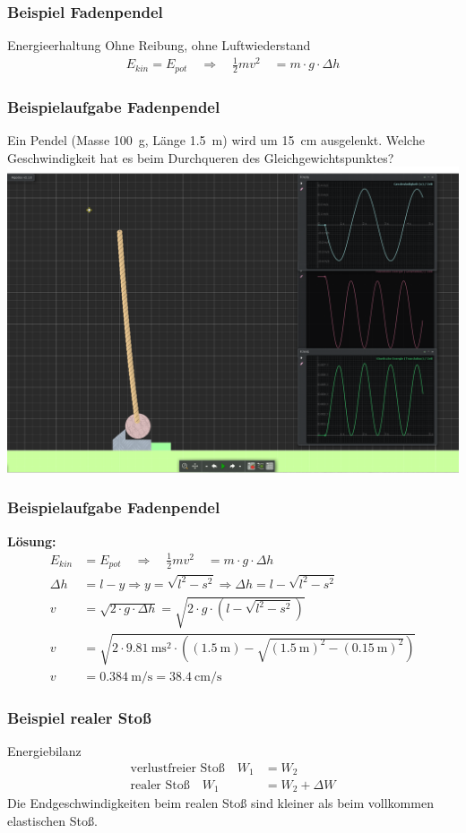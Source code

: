 \documentclass{article}
\begin{document}
\frame
{
  \frametitle{Beispiel Fadenpendel}
  \begin{block}{Energieerhaltung}
  Ohne Reibung, ohne Luftwiederstand
	\begin{align*}
	E_{kin}=E_{pot}\quad\Rightarrow\quad \frac{1}{2}mv^2\quad=m\cdot g\cdot \Delta h
	\end{align*}
  \end{block}
}

\frame
{
  \frametitle{Beispielaufgabe Fadenpendel}
  Ein Pendel (Masse \SI{100}{\gram}, Länge \SI{1.5}{\meter}) wird um \SI{15}{\centi\meter} ausgelenkt. Welche Geschwindigkeit hat es beim Durchqueren des Gleichgewichtspunktes?\\
  \includegraphics[scale=0.1]{Pendel_Aufgabe.png} 
}

\frame
{
  \frametitle{Beispielaufgabe Fadenpendel}
\textbf{Lösung:}	\begin{align*}
	E_{kin}&=E_{pot}\quad\Rightarrow\quad \frac{1}{2}mv^2\quad=m\cdot g\cdot \Delta h\\
	\Delta h&=l-y\Rightarrow y=\sqrt{l^2-s^2}\Rightarrow \Delta h=l-\sqrt{l^2-s^2}\\
	v&=\sqrt{2\cdot g\cdot \Delta h}=\sqrt{2\cdot g \cdot \left( l-\sqrt{l^2-s^2}\right)}\\
	v&=\sqrt{2\cdot \SI{9,81}{\meter\square\second} \cdot \left( (\SI{1.5}{\meter})-\sqrt{(\SI{1.5}{\meter})^2-(\SI{0.15}{\meter})^2}\right)}\\
	v&=\SI{0,384}{\meter\per\second}=\SI{38,4}{\centi\meter\per\second}
	\end{align*}
}

\frame
{
  \frametitle{Beispiel realer Stoß}
  \begin{block}{Energiebilanz}
	\begin{align*}
	\text{verlustfreier Stoß}
	\quad W_1&=W_2\\
	\text{realer Stoß}
	\quad W_1&=W_2+\Delta W
	\end{align*}
	Die Endgeschwindigkeiten beim realen Stoß sind kleiner als beim vollkommen elastischen Stoß.
  \end{block}
}
\end{document}
